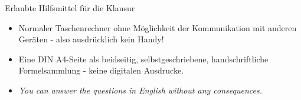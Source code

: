 \documentclass[a4paper, 9pt]{scrartcl}\usepackage[]{graphicx}\usepackage[]{xcolor}
\begin{document}
\date{Sommersemester 2024}
\maketitle
{}
\thispagestyle{empty}
\clearpage

\begin{graybox}{Erlaubte Hilfsmittel f{\"u}r die Klausur}
  \vspace{1Ex}
  \begin{itemize}
  \item Normaler Taschenrechner ohne M{\"o}glichkeit der Kommunikation mit anderen
    Ger{\"a}ten - also ausdr{\"u}cklich kein Handy!
  \item Eine DIN A4-Seite als beidseitig, selbstgeschriebene,
    handschriftliche Formelsammlung - keine digitalen Ausdrucke. 
  \item \textit{You can answer the questions in English without any consequences.}  
  \end{itemize}
\end{graybox}
\vfill
\end{document}
